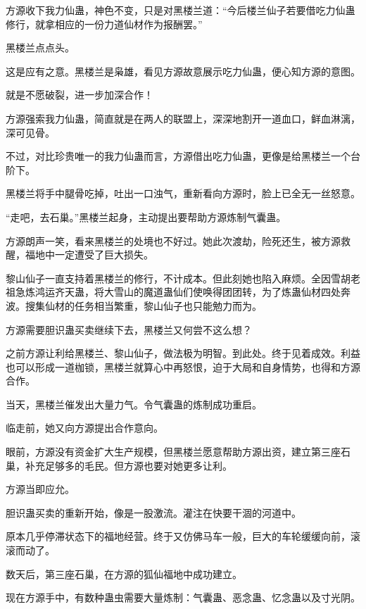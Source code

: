 
\begin{this_body}



方源收下我力仙蛊，神色不变，只是对黑楼兰道：“今后楼兰仙子若要借吃力仙蛊修行，就拿相应的一份力道仙材作为报酬罢。”

黑楼兰点点头。

这是应有之意。黑楼兰是枭雄，看见方源故意展示吃力仙蛊，便心知方源的意图。

就是不愿破裂，进一步加深合作！

方源强索我力仙蛊，简直就是在两人的联盟上，深深地割开一道血口，鲜血淋漓，深可见骨。

不过，对比珍贵唯一的我力仙蛊而言，方源借出吃力仙蛊，更像是给黑楼兰一个台阶下。

黑楼兰将手中腿骨吃掉，吐出一口浊气，重新看向方源时，脸上已全无一丝怒意。

“走吧，去石巢。”黑楼兰起身，主动提出要帮助方源炼制气囊蛊。

方源朗声一笑，看来黑楼兰的处境也不好过。她此次渡劫，险死还生，被方源救醒，福地中一定遭受了巨大损失。

黎山仙子一直支持着黑楼兰的修行，不计成本。但此刻她也陷入麻烦。全因雪胡老祖急炼鸿运齐天蛊，将大雪山的魔道蛊仙们使唤得团团转，为了炼蛊仙材四处奔波。搜集仙材的任务相当繁重，黎山仙子也只能勉力而为。

方源需要胆识蛊买卖继续下去，黑楼兰又何尝不这么想？

之前方源让利给黑楼兰、黎山仙子，做法极为明智。到此处。终于见着成效。利益也可以形成一道枷锁，黑楼兰就算心中再怒恨，迫于大局和自身情势，也得和方源合作。

当天，黑楼兰催发出大量力气。令气囊蛊的炼制成功重启。

临走前，她又向方源提出合作意向。

眼前，方源没有资金扩大生产规模，但黑楼兰愿意帮助方源出资，建立第三座石巢，补充足够多的毛民。但方源也要对她更多让利。

方源当即应允。

胆识蛊买卖的重新开始，像是一股激流。灌注在快要干涸的河道中。

原本几乎停滞状态下的福地经营。终于又仿佛马车一般，巨大的车轮缓缓向前，滚滚而动了。

数天后，第三座石巢，在方源的狐仙福地中成功建立。

现在方源手中，有数种蛊虫需要大量炼制：气囊蛊、恶念蛊、忆念蛊以及寸光阴。


\end{this_body}
